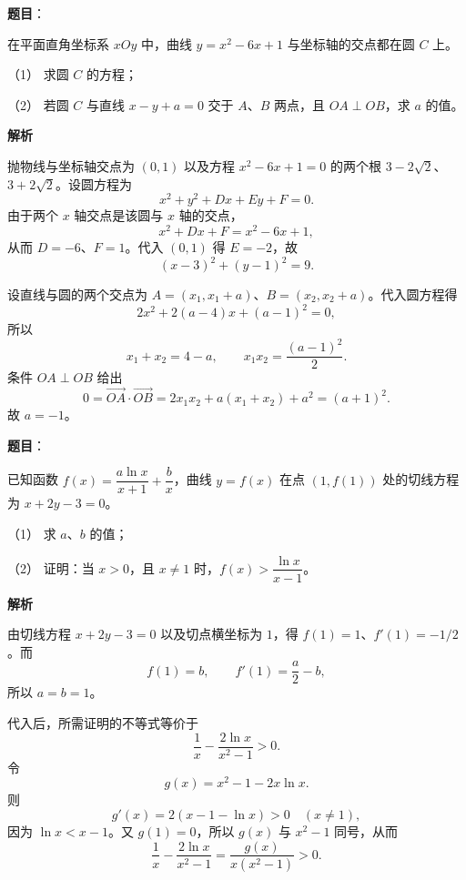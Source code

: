 \begin{answer}

\textbf{题目}：

在平面直角坐标系 $xOy$ 中，曲线 $y=x^2-6x+1$ 与坐标轴的交点都在圆 $C$ 上。

（1） 求圆 $C$ 的方程；

（2） 若圆 $C$ 与直线 $x-y+a=0$ 交于 $A\text{、}B$ 两点，且 $OA\perp OB$，求 $a$ 的值。

\textbf{解析}


抛物线与坐标轴交点为 $(0,1)$ 以及方程
$x^2-6x+1=0$ 的两个根
$3-2\sqrt2$、$3+2\sqrt2$。设圆方程为
\nopagebreak[4]
\[
x^2+y^2+Dx+Ey+F=0.
\]
由于两个 $x$ 轴交点是该圆与 $x$ 轴的交点，
\nopagebreak[4]
\[
x^2+Dx+F=x^2-6x+1,
\]
从而 $D=-6$、$F=1$。代入 $(0,1)$ 得 $E=-2$，故
\nopagebreak[4]
\[
(x-3)^2+(y-1)^2=9.
\]


设直线与圆的两个交点为
$A=(x_1,x_1+a)$、$B=(x_2,x_2+a)$。代入圆方程得
\nopagebreak[4]
\[
2x^2+2(a-4)x+(a-1)^2=0,
\]
所以
\nopagebreak[4]
\[
x_1+x_2=4-a,\qquad x_1x_2=\frac{(a-1)^2}{2}.
\]
条件 $OA\perp OB$ 给出
\nopagebreak[4]
\[
0=\overrightarrow{OA}\cdot\overrightarrow{OB}
=2x_1x_2+a(x_1+x_2)+a^2
=(a+1)^2.
\]
故 $a=-1$。



\end{answer}
\begin{answer}

\textbf{题目}：

已知函数 $f(x)=\dfrac{a\ln x}{x+1}+\dfrac bx$，曲线 $y=f(x)$ 在点 $(1,f(1))$ 处的切线方程为 $x+2y-3=0$。

（1） 求 $a\text{、}b$ 的值；

（2） 证明：当 $x>0$，且 $x\neq1$ 时，$f(x)>\dfrac{\ln x}{x-1}$。

\textbf{解析}


由切线方程 $x+2y-3=0$ 以及切点横坐标为 $1$，得
$f(1)=1$、$f'(1)=-1/2$。而
\nopagebreak[4]
\[
f(1)=b,\qquad f'(1)=\frac a2-b,
\]
所以 $a=b=1$。


代入后，所需证明的不等式等价于
\nopagebreak[4]
\[
\frac1x-\frac{2\ln x}{x^2-1}>0.
\]
令
\nopagebreak[4]
\[
g(x)=x^2-1-2x\ln x.
\]
则
\nopagebreak[4]
\[
g'(x)=2(x-1-\ln x)>0\quad(x\neq1),
\]
因为 $\ln x<x-1$。又 $g(1)=0$，所以 $g(x)$ 与
$x^2-1$ 同号，从而
\nopagebreak[4]
\[
\frac1x-\frac{2\ln x}{x^2-1}
=\frac{g(x)}{x(x^2-1)}>0.
\]



\end{answer}
